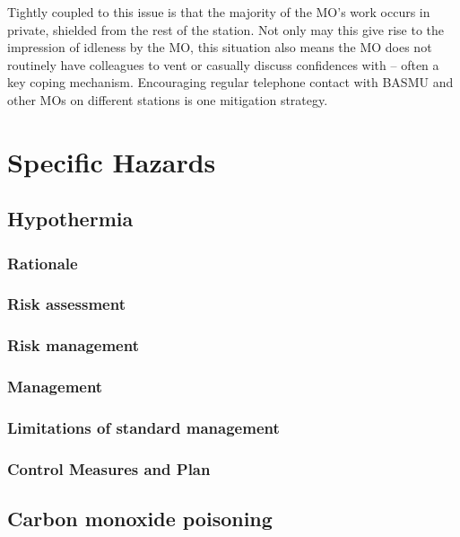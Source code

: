 \documentclass[12pt,a4paper]{article}
\begin{document}
Tightly coupled to this issue is that the majority of the MO's work occurs in private, shielded from the rest of the station. Not only may this give rise to the impression of idleness by the MO, this situation also means the MO does not routinely have colleagues to vent or casually discuss confidences with -- often a key coping mechanism. Encouraging regular telephone contact with BASMU and other MOs on different stations is one mitigation strategy.

\section{Specific Hazards}

\subsection{Hypothermia}

\subsubsection{Rationale}

\subsubsection{Risk assessment}

\subsubsection{Risk management}

\subsubsection{Management}

\subsubsection{Limitations of standard management}

\subsubsection{Control Measures and Plan}

\subsection{Carbon monoxide poisoning}
\end{document}
